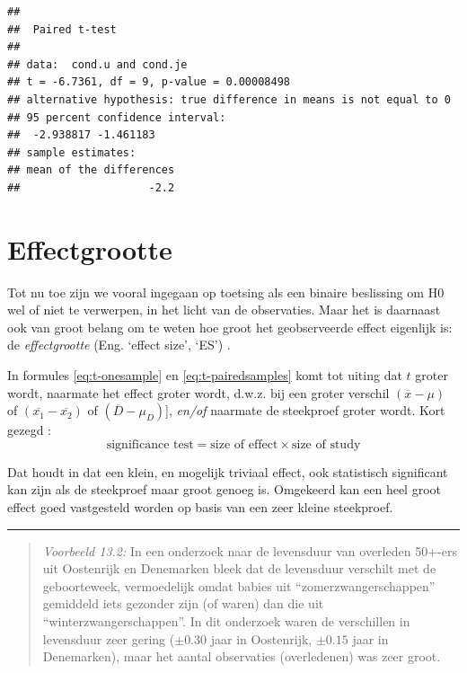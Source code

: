 \documentclass[
]{book}
\begin{document}
\begin{verbatim}
## 
##  Paired t-test
## 
## data:  cond.u and cond.je
## t = -6.7361, df = 9, p-value = 0.00008498
## alternative hypothesis: true difference in means is not equal to 0
## 95 percent confidence interval:
##  -2.938817 -1.461183
## sample estimates:
## mean of the differences 
##                    -2.2
\end{verbatim}

\hypertarget{sec:ttoets-effectgrootte}{%
\section{Effectgrootte}\label{sec:ttoets-effectgrootte}}

Tot nu toe zijn we vooral ingegaan op toetsing als een binaire
beslissing om H0 wel of niet te verwerpen, in het licht van de
observaties. Maar het is daarnaast ook van groot belang om te weten hoe
groot het geobserveerde effect eigenlijk is: de \emph{effectgrootte} (Eng.
`effect size', `ES') \citep{Cohen88, Thom02, Naka07}.

In formules \eqref{eq:t-onesample} en \eqref{eq:t-pairedsamples} komt tot uiting
dat \(t\) groter wordt,
naarmate het effect groter wordt, d.w.z. bij een groter verschil
\((\overline{x}-\mu)\) of \((\overline{x_1}-\overline{x_2})\) of
\((\overline{D}-\mu_D)\){]}, \emph{en/of} naarmate de steekproef groter wordt.
Kort gezegd \citep[ p.338, formule 11.10]{Rose08}:
\begin{equation}
  \label{eq:Rose08}
    \textrm{significance test} = 
    \textrm{size of effect} \times \textrm{size of study}
\end{equation}

Dat houdt
in dat een klein, en mogelijk triviaal effect, ook statistisch
significant kan zijn als de steekproef maar groot genoeg is. Omgekeerd
kan een heel groot effect goed vastgesteld worden op basis van een zeer
kleine steekproef.

\begin{center}\rule{0.5\linewidth}{0.5pt}\end{center}

\begin{quote}
\emph{Voorbeeld 13.2:}
In een onderzoek naar de levensduur van overleden 50+-ers uit Oostenrijk
en Denemarken \citep{Dobl99} bleek dat de levensduur verschilt met de
geboorteweek, vermoedelijk omdat babies uit ``zomerzwangerschappen''
gemiddeld iets gezonder zijn (of waren) dan die uit
``winterzwangerschappen''. In dit onderzoek waren de verschillen in
levensduur zeer gering (\(\pm 0.30\) jaar in Oostenrijk, \(\pm 0.15\) jaar
in Denemarken), maar het aantal observaties (overledenen) was zeer groot.
\end{quote}
\end{document}

